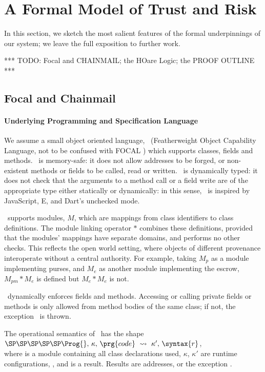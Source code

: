 \section{A Formal Model of Trust and Risk}
\label{section:formal}
 
In this section, we sketch the most salient features of the formal underpinnings of our system; we leave the full exposition to further work.
 
*** TODO: Focal and CHAINMAIL; the HOare Logic; the PROOF OUTLINE ***


\subsection{Focal and Chainmail}

\paragraph{Underlying Programming and Specification Language}
We assume a small object oriented language, \LangOO\ 
(Featherweight Object Capability Language, not to be confused
with FOCAL \cite{FOCAL-69}) 
which supports classes, fields and methods.
%
\LangOO\ is  memory-safe: it does not allow
addresses to be forged, or non-existent methods or fields to be
called, read or written.   \LangOO\ is dynamically typed: it does not check
that the arguments to a method call or a field write are of the
appropriate type either statically or dynamically: in this sense,
\LangOO\ is inspired by JavaScript, E, and Dart's unchecked mode.
 

\LangOO\  supports modules, $M$, which are  mappings from class
identifiers to class definitions. 
The module linking operator $*$ combines these definitions, provided that 
the modules' mappings have separate domains, and performs no other checks. 
This reflects the open world setting,
where objects of different provenance interoperate without a central
authority.
For example, taking $M_{p}$ as a module implementing purses, and $M_e$
as another module implementing the escrow,
$M_{pm}*M_e$ is defined but $M_{e}*M_e$ is not.


\LangOO\  dynamically enforces  fields  and methods.   Accessing or calling
private fields or methods is only allowed from method bodies of the
same class; if not, the exception \stuck\ is thrown.
 

The operational semantics of  \LangOO\ has the shape\\
 $\SP\SP\SP\SP\SP  \Prog{},\, \kappa,\, \prg{code}\ \leadsto\  \kappa',\, \syntax{r}$,\\
  where   \Prog{} is a module containing all class declarations used,
  $\kappa$, $\kappa'$ are runtime configurations, \sd{\prg{code} is
    some code in the syntax of \LangOO},  and \syntax{r} is a
  result. Results are  addresses, %
  or the exception \stuck.

